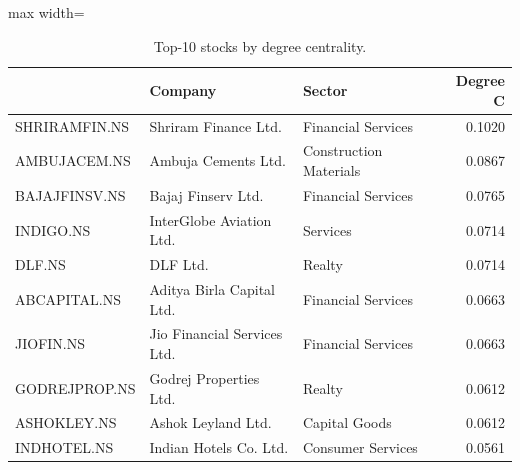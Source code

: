 \begin{table}
\centering
\caption{Top-10 stocks by degree centrality.}
\label{tab:top10_degree}
\begin{adjustbox}{max width=\textwidth}
\begin{tabular}{lllr}
\toprule
 & Company & Sector & Degree C \\
\midrule
SHRIRAMFIN.NS & Shriram Finance Ltd. & Financial Services & 0.1020 \\
AMBUJACEM.NS & Ambuja Cements Ltd. & Construction Materials & 0.0867 \\
BAJAJFINSV.NS & Bajaj Finserv Ltd. & Financial Services & 0.0765 \\
INDIGO.NS & InterGlobe Aviation Ltd. & Services & 0.0714 \\
DLF.NS & DLF Ltd. & Realty & 0.0714 \\
ABCAPITAL.NS & Aditya Birla Capital Ltd. & Financial Services & 0.0663 \\
JIOFIN.NS & Jio Financial Services Ltd. & Financial Services & 0.0663 \\
GODREJPROP.NS & Godrej Properties Ltd. & Realty & 0.0612 \\
ASHOKLEY.NS & Ashok Leyland Ltd. & Capital Goods & 0.0612 \\
INDHOTEL.NS & Indian Hotels Co. Ltd. & Consumer Services & 0.0561 \\
\bottomrule
\end{tabular}
\end{adjustbox}
\end{table}
